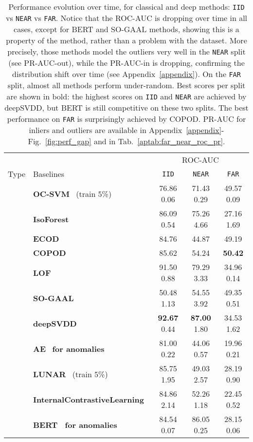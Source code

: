 \documentclass{article}
\begin{document}
\begingroup
\setlength{\tabcolsep}{6pt} \begin{table}[t]
\begin{center}
    \caption{Performance evolution over time, for classical and deep methods: \texttt{IID} vs \texttt{NEAR} vs \texttt{FAR}. Notice that the ROC-AUC is dropping over time in all cases, except for BERT and SO-GAAL methods, showing this is a property of the method, rather than a problem with the dataset. More precisely, those methods model the outliers very well in the \texttt{NEAR} split (see PR-AUC-out), while the PR-AUC-in is dropping, confirming the distribution shift over time (see Appendix~\ref{appendix}). On the \texttt{FAR} split, almost all methods perform under-random. Best scores per split are shown in bold: the highest scores on \texttt{IID} and \texttt{NEAR} are achieved by deepSVDD, but BERT is still competitive on these two splits. The best performance on \texttt{FAR} is surprisingly achieved by COPOD. PR-AUC for inliers and outliers are available in Appendix~\ref{appendix}-Fig.~\ref{fig:perf_gap} and in Tab.~\ref{aptab:far_near_roc_pr}.}
    
    \begin{tabular}{c l c c c}\toprule
    & & \multicolumn{3}{c}{ROC-AUC } \\
    \cmidrule(lr){3-5}
    Type & Baselines & \texttt{IID} & \texttt{NEAR} & \texttt{FAR}  \\
    \midrule
    \parbox[t]{2mm}{} & 
    \textbf{OC-SVM}~\cite{ocsvm} (train 5\%)  & 76.86  \small 0.06 & 71.43  \small 0.29 & 49.57  \small 0.09\\    
    
    &\textbf{IsoForest}~\cite{isoforest} & 86.09  \small 0.54 & 75.26  \small 4.66 & 27.16  \small 1.69\\
    &\textbf{ECOD}~\cite{ecod} & 84.76 & 44.87 & 49.19 \\
    &\textbf{COPOD}~\cite{copod} & 85.62 & 54.24 & \textbf{50.42} \\
    &\textbf{LOF}~\cite{lof} & 91.50  \small 0.88 & 79.29  \small 3.33 & 34.96  \small 0.14 \\
    \cmidrule(lr){1-5}
    \parbox[t]{2mm}{} 
    & \textbf{SO-GAAL}~\cite{mo_gaal} & 50.48  \small 1.13 & 54.55  \small 3.92 & 49.35  \small 0.51\\
    &\textbf{deepSVDD}~\cite{deepsvdd} & \textbf{92.67}  \small 0.44  & \textbf{87.00}  \small 1.80  & 34.53  \small 1.62  \\
&\textbf{AE}~\cite{autoencoder} \textbf{for anomalies} & 81.00  \small 0.22 & 44.06  \small 0.57 & 19.96  \small 0.21 \\
    &\textbf{LUNAR}~\cite{lunar} (train 5\%) & 85.75  \small 1.95 & 49.03
     \small 2.57 & 28.19  \small 0.90 \\ 
    &\textbf{InternalContrastiveLearning}~\cite{icl} & 84.86  \small 2.14 & 52.26  \small 1.18 & 22.45  \small 0.52\\
    &\textbf{BERT~\cite{bert} for anomalies} & 84.54  \small 0.07 & 86.05  \small 0.25 & 28.15  \small 0.06 \\
    

\end{tabular}
\end{center}
\end{table}
\end{document}
